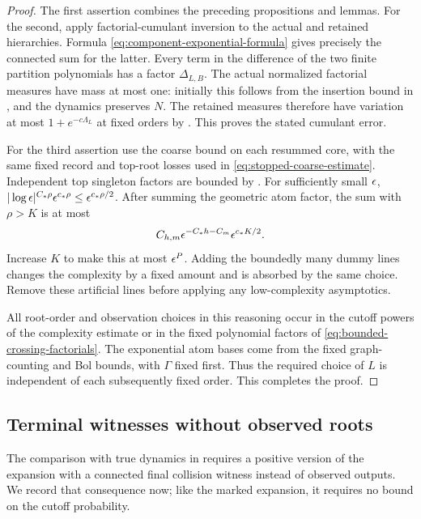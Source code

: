 \begin{proof}
The first assertion combines the preceding propositions and lemmas.
For the second, apply factorial-cumulant inversion to the actual and
retained hierarchies.  Formula
\eqref{eq:component-exponential-formula} gives precisely the connected
sum for the latter.  Every term in the difference of the two finite
partition polynomials has a factor $\Delta_{L,B}$.  The actual
normalized factorial measures have mass at most one: initially this
follows from the insertion bound in , and the
dynamics preserves $N$.  The retained measures therefore have
variation at most $1+e^{-c\Lambda_L}$ at fixed orders by
.  This proves the stated cumulant error.

For the third assertion use the coarse bound on each resummed core,
with the same fixed record and top-root losses used in
\eqref{eq:stopped-coarse-estimate}.  Independent top singleton factors
are bounded by .  For sufficiently small $\epsilon$,
$|\log\epsilon|^{C_*\rho}\epsilon^{c_*\rho}\le\epsilon^{c_*\rho/2}$.
After summing the geometric atom factor, the sum with $\rho>K$ is at
most
\[
 C_{h,m}\epsilon^{-C_*h-C_m}\epsilon^{c_*K/2}.
\]
Increase $K$ to make this at most $\epsilon^P$.  Adding the boundedly many
dummy lines changes the complexity by a fixed amount and is absorbed
by the same choice.  Remove these artificial lines before applying any
low-complexity asymptotics.

All root-order and observation choices in this reasoning occur in the
cutoff powers of the complexity estimate or in the fixed polynomial
factors of \eqref{eq:bounded-crossing-factorials}.  The exponential
atom bases come from the fixed graph-counting and Bol bounds, with
$\Gamma$ fixed first.  Thus the required choice of $L$ is independent
of each subsequently fixed order.  This completes the proof.
\end{proof}

\subsection{Terminal witnesses without observed roots}

The comparison with true dynamics in  requires a
positive version of the expansion with a connected final collision
witness instead of observed outputs. We record that consequence now;
like the marked expansion, it requires no bound on the cutoff probability.

